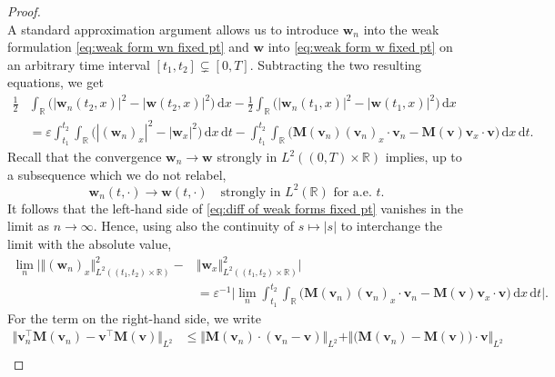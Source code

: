 \documentclass[10pt,a4paper]{amsart}
\newcommand{\bM}{\mathbf{M}}
\newcommand{\bv}{\mathbf{v}}
\newcommand{\bw}{\mathbf{w}}
\renewcommand{\d}{\, \mathrm{d}}
\renewcommand{\leq}{\leqslant}
\begin{document}
\begin{proof}
\begin{equation}
\end{equation}
A standard approximation argument allows us to introduce $\bw_n$ into the weak formulation \eqref{eq:weak form wn fixed pt} and $\bw$ into \eqref{eq:weak form w fixed pt} on an arbitrary time interval $[t_1,t_2] \subsetneq [0,T]$. Subtracting the two resulting equations, we get 
\begin{equation}\label{eq:diff of weak forms fixed pt}
   \begin{aligned} \frac{1}{2}&\int_\mathbb{R} \big( |\bw_n(t_2,x)|^2 -  |\bw(t_2,x)|^2 \big) \d x - \frac{1}{2}\int_\mathbb{R} \big(|\bw_n(t_1,x)|^2 - |\bw(t_1,x)|^2 \big) \d x \\ 
   &= \varepsilon \int_{t_1}^{t_2} \int_\mathbb{R} \big( |(\bw_n)_x|^2 - |\bw_x|^2 \big) \d x \d t -\int_{t_1}^{t_2}\int_\mathbb{R} \Big( \bM(\bv_n) (\bv_n)_x \cdot \bv_n - \bM(\bv) \bv_x \! \cdot \! \bv \Big) \d x \d t. 
   \end{aligned}
\end{equation}
Recall that the convergence $\bw_n \to \bw$ strongly in $L^2((0,T)\times\mathbb{R})$ implies, up to a subsequence which we do not relabel, 
\begin{equation*}
    \bw_n(t,\cdot) \to \bw(t,\cdot) \quad \text{strongly in } L^2(\mathbb{R}) \text{ for a.e.~}t. 
\end{equation*}
It follows that the left-hand side of \eqref{eq:diff of weak forms fixed pt} vanishes in the limit as $n\to\infty$. Hence, using also the continuity of $s \mapsto |s|$ to interchange the limit with the absolute value, 
\begin{equation}\label{eq:diff of weak forms fixed pt checkpoint}
      \begin{aligned} \lim_n \Big| \Vert (\bw_n )_x \Vert^2_{L^2((t_1,t_2)\times\mathbb{R})} -&  \Vert \bw_x \Vert^2_{L^2((t_1,t_2)\times\mathbb{R})}\Big| \\ 
      &= \varepsilon^{-1} \bigg|\lim_n \int_{t_1}^{t_2}\int_\mathbb{R} \Big( \bM(\bv_n) (\bv_n)_x \cdot \bv_n - \bM(\bv) \bv_x \cdot \bv \Big) \d x \d t\bigg|. 
   \end{aligned}
\end{equation}
For the term on the right-hand side, we write
\begin{equation}\label{eq:using dct to conclude fixed pt cpctness}
    \begin{aligned}
      \Vert \bv_n^\intercal \bM(\bv_n) - \bv^\intercal \bM(\bv) \Vert_{L^2} &\leq \Vert \bM(\bv_n) \cdot (\bv_n - \bv) \Vert_{L^2} + \Vert \big( \bM(\bv_n) - \bM(\bv) \big) \cdot \bv \Vert_{L^2} \\ 

\end{aligned}
\end{equation}
\end{proof}
\end{document}
